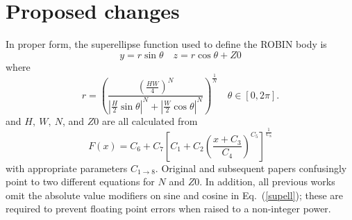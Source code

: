 \documentclass[journal]{new-aiaa}
\begin{document}
\section{Proposed changes}
In proper form, the superellipse function used to define the ROBIN body is
\begin{equation}
   y=r \sin \theta \quad z=r \cos \theta +Z0
\end{equation} 
where
\begin{equation}
  r=\left(\frac{\left(\frac{HW}{4}\right)^{N}}{|\frac{H}{2}\sin \theta|^{N}+|\frac{W}{2}\cos \theta|^{N}}\right)^{\frac{1}{N}} \quad \theta\in[0,2\pi].
\label{supell}
\end{equation}
and $H, \ W, \ N$, and $Z0$ are all calculated from
\begin{equation}
  F\!\left(x\right) = C_{6}+C_{7}\left[C_{1}+C_{2}\left(\frac{x+C_{3}}{C_{4}}\right)^{C_{5}}\right]^{\frac{1}{C_{8}}}
\end{equation}
with appropriate parameters $C_{1 \to 8}$.
Original \cite{nasa80051} and subsequent \cite{nasa87762} papers confusingly point to two different equations
for $N$ and $Z0$.
In addition, all previous works omit the absolute value modifiers on sine and cosine in Eq.~(\ref{supell}); these are
required to prevent floating point errors when raised to a non-integer power.
\end{document}

